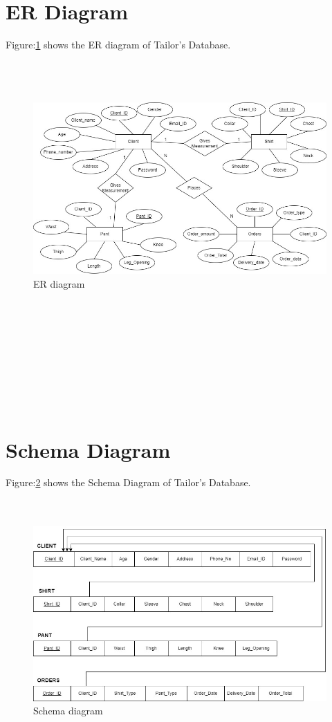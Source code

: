 \documentclass[12pt, letter paper]{report}
\begin{document}
{\section{ER Diagram} 
Figure:\ref{fig:tailor_database.jpg} shows the ER diagram of Tailor's Database.
\\
\\
\\
\\
\begin{figure}[h]
 \centering
 \includegraphics[width=1\textwidth]{tailor_database.jpg}
 \caption{ER diagram}
 \label{fig:tailor_database.jpg}
\end{figure}
\\
\\
\\
\\
\\
\\
\\
\\
\section{Schema Diagram} 
Figure:\ref{fig:tailor_schema(1).jpg} shows the Schema Diagram of Tailor's Database.
\\
\\
\\
\begin{figure}[h]
 \centering
 \includegraphics[width=1\textwidth]{tailor_schema (1).jpg}
 \caption{Schema diagram}
 \label{fig:tailor_schema(1).jpg}
\end{figure}
}
\end{document}
